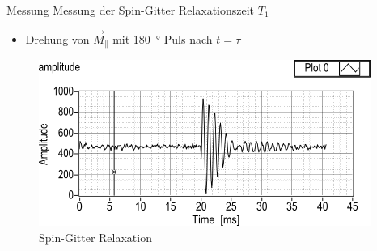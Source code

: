 \begin{frame}{Messung}
Messung der Spin-Gitter Relaxationszeit $T_1$
\begin{itemize}
\item Drehung von $\vec{M}_\parallel$ mit \SI{180}{\degree} Puls nach $t=\tau$
\end{itemize}
	\begin{figure}
	\centering
	\includegraphics[scale=.65]{images//spinlattice.png}
	\caption{Spin-Gitter Relaxation \cite{script_nmr}}
	\end{figure}
\end{frame}

